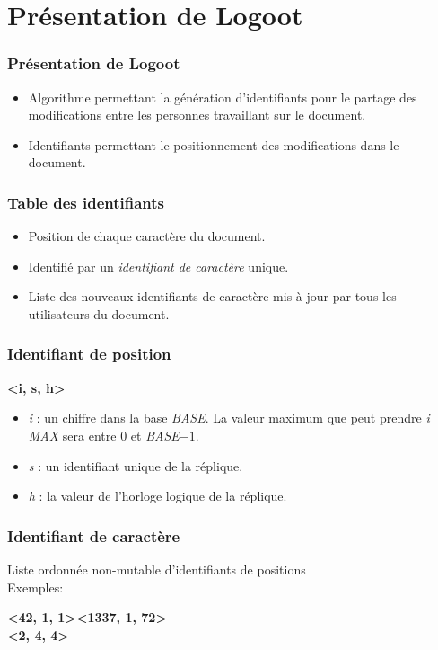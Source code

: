 \section{Présentation de Logoot}
  \begin{frame}
    \frametitle{Présentation de Logoot}
    \begin{itemize}
      \item Algorithme permettant la génération d'identifiants pour le partage des modifications entre les personnes travaillant sur le document.
      \item Identifiants permettant le positionnement des modifications dans le document.
    \end{itemize}
  \end{frame}

\begin{frame}
    \frametitle{Table des identifiants}
      \begin{itemize}
      	\item Position de chaque caractère du document.
      	\item Identifié par un \emph{identifiant de caractère} unique.
      	\item Liste des nouveaux identifiants de caractère mis-à-jour par tous les utilisateurs du document.
    \end{itemize}
  \end{frame}

\begin{frame}  
  \frametitle{Identifiant de position}
	\begin{center}
		\textbf{<i, s, h>}
	\end{center}
		\begin{itemize}
			\item \emph{i} : un chiffre dans la base \emph{BASE}. La valeur
			maximum que peut prendre \emph{i} \emph{MAX} sera entre $0$ et
			\emph{BASE}$ - 1$.
			\item \emph{s} : un identifiant unique de la réplique.
			\item \emph{h} : la valeur de l'horloge logique de la réplique.
		\end{itemize}
  \end{frame}

\begin{frame}  
  \frametitle{Identifiant de caractère}
  	Liste ordonnée non-mutable d'identifiants de positions\\
  	Exemples:
	\begin{center}
		\textbf{<42, 1, 1><1337, 1, 72>}\\
		\textbf{<2, 4, 4>}
	\end{center}
  \end{frame}

